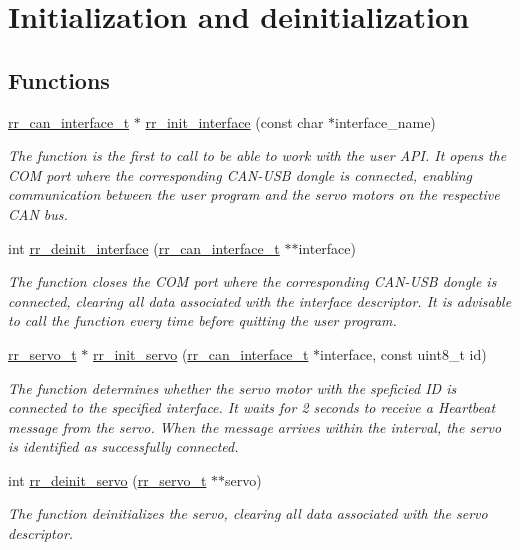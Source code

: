 \hypertarget{group___init}{}\section{Initialization and deinitialization}
\label{group___init}
\subsection*{Functions}
\begin{DoxyCompactItemize}
\item 
\hyperlink{structrr__can__interface__t}{rr\+\_\+can\+\_\+interface\+\_\+t} $\ast$ \hyperlink{group___init_ga472a4890dcc7d7a13123c56a06946d91}{rr\+\_\+init\+\_\+interface} (const char $\ast$interface\+\_\+name)
\begin{DoxyCompactList}\small\item\em The function is the first to call to be able to work with the user A\+PI. It opens the C\+OM port where the corresponding C\+A\+N-\/\+U\+SB dongle is connected, enabling communication between the user program and the servo motors on the respective C\+AN bus. \end{DoxyCompactList}\item 
int \hyperlink{group___init_ga10cbfcf4b80ebfd0d4df74441bbbe91a}{rr\+\_\+deinit\+\_\+interface} (\hyperlink{structrr__can__interface__t}{rr\+\_\+can\+\_\+interface\+\_\+t} $\ast$$\ast$interface)
\begin{DoxyCompactList}\small\item\em The function closes the C\+OM port where the corresponding C\+A\+N-\/\+U\+SB dongle is connected, clearing all data associated with the interface descriptor. It is advisable to call the function every time before quitting the user program. \end{DoxyCompactList}\item 
\hyperlink{structrr__servo__t}{rr\+\_\+servo\+\_\+t} $\ast$ \hyperlink{group___init_ga0adb313a3eeb8a4399431e940a1f3e9e}{rr\+\_\+init\+\_\+servo} (\hyperlink{structrr__can__interface__t}{rr\+\_\+can\+\_\+interface\+\_\+t} $\ast$interface, const uint8\+\_\+t id)
\begin{DoxyCompactList}\small\item\em The function determines whether the servo motor with the speficied ID is connected to the specified interface. It waits for 2 seconds to receive a Heartbeat message from the servo. When the message arrives within the interval, the servo is identified as successfully connected.~\newline
 \end{DoxyCompactList}\item 
int \hyperlink{group___init_gafebc52982ef705b8d0f805d5ee5ca9f7}{rr\+\_\+deinit\+\_\+servo} (\hyperlink{structrr__servo__t}{rr\+\_\+servo\+\_\+t} $\ast$$\ast$servo)
\begin{DoxyCompactList}\small\item\em The function deinitializes the servo, clearing all data associated with the servo descriptor. \end{DoxyCompactList}\end{DoxyCompactItemize}


